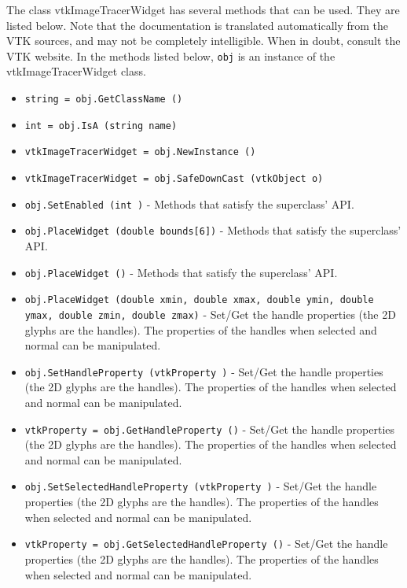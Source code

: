 The class vtkImageTracerWidget has several methods that can be used.
  They are listed below.
Note that the documentation is translated automatically from the VTK sources,
and may not be completely intelligible.  When in doubt, consult the VTK website.
In the methods listed below, \verb|obj| is an instance of the vtkImageTracerWidget class.
\begin{itemize}
\item  \verb|string = obj.GetClassName ()|

\item  \verb|int = obj.IsA (string name)|

\item  \verb|vtkImageTracerWidget = obj.NewInstance ()|

\item  \verb|vtkImageTracerWidget = obj.SafeDownCast (vtkObject o)|

\item  \verb|obj.SetEnabled (int )| -  Methods that satisfy the superclass' API.

\item  \verb|obj.PlaceWidget (double bounds[6])| -  Methods that satisfy the superclass' API.

\item  \verb|obj.PlaceWidget ()| -  Methods that satisfy the superclass' API.

\item  \verb|obj.PlaceWidget (double xmin, double xmax, double ymin, double ymax, double zmin, double zmax)| -  Set/Get the handle properties (the 2D glyphs are the handles). The
 properties of the handles when selected and normal can be manipulated.

\item  \verb|obj.SetHandleProperty (vtkProperty )| -  Set/Get the handle properties (the 2D glyphs are the handles). The
 properties of the handles when selected and normal can be manipulated.

\item  \verb|vtkProperty = obj.GetHandleProperty ()| -  Set/Get the handle properties (the 2D glyphs are the handles). The
 properties of the handles when selected and normal can be manipulated.

\item  \verb|obj.SetSelectedHandleProperty (vtkProperty )| -  Set/Get the handle properties (the 2D glyphs are the handles). The
 properties of the handles when selected and normal can be manipulated.

\item  \verb|vtkProperty = obj.GetSelectedHandleProperty ()| -  Set/Get the handle properties (the 2D glyphs are the handles). The
 properties of the handles when selected and normal can be manipulated.


\end{itemize}

